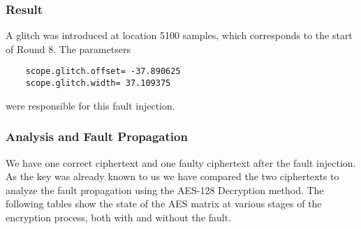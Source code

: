 \subsubsection{Result}
A glitch was introduced at location 5100 samples, which corresponds to the start of Round 8. The parametsers 
\begin{verbatim}
    scope.glitch.offset= -37.890625 
    scope.glitch.width= 37.109375
\end{verbatim}
were responsible for this fault injection.

\subsubsection{Analysis and Fault Propagation}
We have one correct ciphertext and one faulty ciphertext after the fault injection. As the key was already known to us we have compared the two ciphertexts to analyze the fault propagation using the AES-128 Decryption method. The following tables show the state of the AES matrix at various stages of the encryption process, both with and without the fault.


